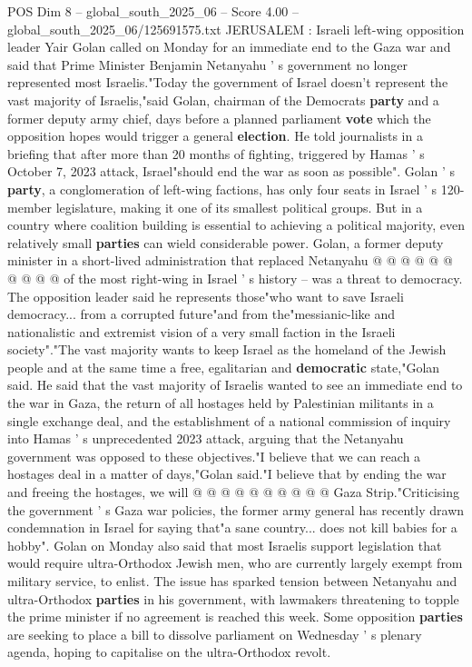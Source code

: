 \begin{textsample}{POS Dim 8 – global\_south\_2025\_06 – Score 4.00 – global\_south\_2025\_06/125691575.txt}  \label{ex:f8_pos_425}
JERUSALEM : Israeli left-wing opposition leader Yair Golan called on Monday for an immediate end to the Gaza war and said that Prime Minister Benjamin Netanyahu ' s government no longer represented most Israelis."Today the government of Israel doesn't represent the vast majority of Israelis,"said Golan, chairman of the Democrats \textbf{party} and a former deputy army chief, days before a planned parliament \textbf{vote} which the opposition hopes would trigger a general \textbf{election}.
He told journalists in a briefing that after more than 20 months of fighting, triggered by Hamas ' s October 7, 2023 attack, Israel"should end the war as soon as possible".
Golan ' s \textbf{party}, a conglomeration of left-wing factions, has only four seats in Israel ' s 120-member legislature, making it one of its smallest political groups.
But in a country where coalition building is essential to achieving a political majority, even relatively small \textbf{parties} can wield considerable power.
Golan, a former deputy minister in a short-lived administration that replaced Netanyahu @ @ @ @ @ @ @ @ @ @ of the most right-wing in Israel ' s history -- was a threat to democracy.
The opposition leader said he represents those"who want to save Israeli democracy... from a corrupted future"and from the"messianic-like and nationalistic and extremist vision of a very small faction in the Israeli society"."The vast majority wants to keep Israel as the homeland of the Jewish people and at the same time a free, egalitarian and \textbf{democratic} state,"Golan said.
He said that the vast majority of Israelis wanted to see an immediate end to the war in Gaza, the return of all hostages held by Palestinian militants in a single exchange deal, and the establishment of a national commission of inquiry into Hamas ' s unprecedented 2023 attack, arguing that the Netanyahu government was opposed to these objectives."I believe that we can reach a hostages deal in a matter of days,"Golan said."I believe that by ending the war and freeing the hostages, we will @ @ @ @ @ @ @ @ @ @ Gaza Strip."Criticising the government ' s Gaza war policies, the former army general has recently drawn condemnation in Israel for saying that"a sane country... does not kill babies for a hobby".
Golan on Monday also said that most Israelis support legislation that would require ultra-Orthodox Jewish men, who are currently largely exempt from military service, to enlist.
The issue has sparked tension between Netanyahu and ultra-Orthodox \textbf{parties} in his government, with lawmakers threatening to topple the prime minister if no agreement is reached this week.
Some opposition \textbf{parties} are seeking to place a bill to dissolve parliament on Wednesday ' s plenary agenda, hoping to capitalise on the ultra-Orthodox revolt.

\end{textsample}
